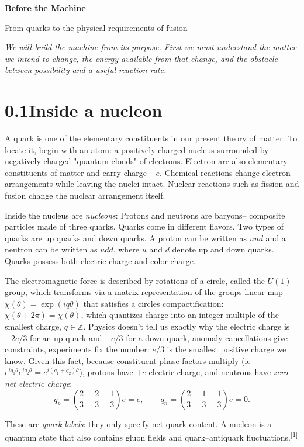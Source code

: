 \documentclass[11pt]{article}
\newcommand{\heading}[2]{\phantomsection\pdfbookmark[1]{#1. #2}{section#1}\section*{#1\quad #2}}
\newcommand{\refn}[1]{\textsuperscript{\hyperlink{src#1}{[#1]}}}
\begin{document}
{\LARGE\bfseries Before the Machine}\par

{\large From quarks to the physical requirements of fusion}\par
\vspace{4pt}
\textit{We will build the machine from its purpose. First we must understand the
matter we intend to change, the energy available from that change, and the
obstacle between possibility and a useful reaction rate.}

\heading{0.1}{Inside a nucleon}

A quark is one of the elementary constituents in our present theory of matter.
To locate it, begin with an atom: a positively charged nucleus surrounded by
negatively charged "quantum clouds" of electrons. Electron are also elementary constituents of matter and carry charge $-e$. Chemical reactions change electron arrangements while leaving the nuclei intact. Nuclear reactions such as fission and fusion change the nuclear arrangement itself.

Inside the nucleus are \emph{nucleons}: Protons and neutrons are baryons-- composite particles made of three quarks. Quarks come in different flavors. Two types of quarks are up quarks and down quarks. A proton can be written as $uud$ and a neutron can be written as $udd$, where
$u$ and $d$ denote up and down quarks. Quarks possess both electric charge and color charge.

The electromagnetic force is described by rotations of a circle, called the $U(1)$ group, which transforms via a matrix representation of the groups linear map $\chi(\theta) = \exp(iq\theta)$ that satisfies a circles compactification: $\chi(\theta + 2\pi) = \chi(\theta)$, which quantizes charge into an integer multiple of the smallest charge, $q \in \mathbb{Z}$. Physics doesn't tell us exactly why the electric charge is $+2e/3$ for an up quark and $-e/3$ for a down quark, anomaly cancellations give constraints, experiments fix the number: $e/3$ is the smallest positive charge we know. Given this fact, because constituent phase factors multiply (ie $e^{iq_1\theta}e^{iq_2\theta}=e^{i(q_1+q_2)\theta}$), protons have $+e$ electric charge, and
neutrons have \emph{zero net electric charge}:
\[
q_p=\left(\frac23+\frac23-\frac13\right)e=e,
\qquad
q_n=\left(\frac23-\frac13-\frac13\right)e=0.
\]

These are \emph{quark labels}: they only specify net quark content. A nucleon is a quantum state that also contains gluon fields and quark--antiquark fluctuations.\refn{1}
\end{document}
